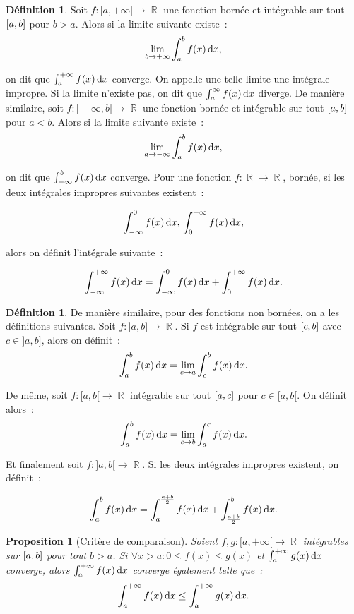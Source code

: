 \documentclass{article}
\DeclareMathOperator{\R}{\mathbb R}
\newtheorem{prp}[thm]{Proposition}
\theoremstyle{definition}
\newtheorem{déf}[thm]{Définition}
\theoremstyle{remark}
\begin{document}
		\begin{déf} Soit $f : [a, +\infty[ \to \R$ une fonction bornée et intégrable sur tout $\interval ab$ pour $b > a$. Alors si la limite suivante existe~:
		\[\lim_{b \to +\infty}\int_a^bf(x)\dif x,\]

		on dit que $\int_a^{+\infty} f(x)\dif x$ converge. On appelle une telle limite une intégrale impropre. Si la limite n'existe pas, on dit que
		$\int_a^\infty f(x)\dif x$ diverge. De manière similaire, soit $f : ]-\infty, b] \to \R$ une fonction bornée et intégrable sur tout $\interval ab$ pour
		$a < b$. Alors si la limite suivante existe~:
		\[\lim_{a \to -\infty}\int_a^bf(x)\dif x,\]

		on dit que $\int_{-\infty}^bf(x)\dif x$ converge. Pour une fonction $f : \R \to \R$, bornée, si les deux intégrales impropres suivantes existent~:

		\[\int_{-\infty}^0f(x)\dif x, \\
		\int_0^{+\infty}f(x)\dif x,\]

		alors on définit l'intégrale suivante~:

		\[\int_{-\infty}^{+\infty}f(x)\dif x = \int_{-\infty}^0f(x)\dif x + \int_0^{+\infty}f(x)\dif x.\]
		\end{déf}

		\begin{déf} De manière similaire, pour des fonctions non bornées, on a les définitions suivantes. Soit $f : ]a, b] \to \R$. Si $f$ est intégrable
		sur tout $\interval cb$ avec $c \in ]a, b]$, alors on définit~:
		\[\int_a^bf(x)\dif x = \lim_{c \to a}\int_c^bf(x)\dif x.\]

		De même, soit $f : [a, b[ \to \R$ intégrable sur tout $\interval ac$ pour $c \in [a, b[$. On définit alors~:
		\[\int_a^bf(x)\dif x = \lim_{c \to b}\int_a^cf(x)\dif x.\]

		Et finalement soit $f : ]a, b[ \to \R$. Si les deux intégrales impropres existent, on définit~:

		\[\int_a^bf(x)\dif x = \int_a^{\frac {a+b}2}f(x)\dif x + \int_{\frac {a+b}2}^bf(x)\dif x.\]
		\end{déf}

		\begin{prp}[Critère de comparaison] Soient $f, g : [a, +\infty[ \to \R$ intégrables sur $\interval ab$ pour tout $b > a$. Si
		$\forall x > a : 0 \leq f(x) \leq g(x)$ et $\int_a^{+\infty}g(x)\dif x$ converge, alors $\int_a^{+\infty}f(x)\dif x$ converge également telle que~:
		\[\int_a^{+\infty}f(x)\dif x \leq \int_a^{+\infty}g(x)\dif x.\]
		\end{prp}
\end{document}
